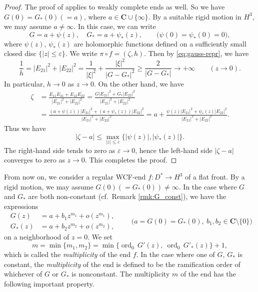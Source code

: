 \documentclass[a4paper]{amsart}
\theoremstyle{plain}
\theoremstyle{remark}
\numberwithin{equation}{section}
\begin{document}
\begin{proof}
 The proof of \cite[Lemma 3.10]{KUY2}
 applies to weakly complete ends as well.
 So we have
 $G(0)=G_*(0)(=a)$, where $a \in {\boldsymbol{C}}\cup\{\infty\}$.
 By a suitable rigid motion in $H^3$, we may assume $a \neq\infty$.
 In this case, we can write
 \[
     G = a + \psi(z),\quad
     G_* = a+\psi_*(z),
    \qquad \bigl(\psi(0)=\psi_*(0)=0\bigr),
 \]
 where $\psi(z)$, $\psi_*(z)$ are holomorphic
 functions defined on a sufficiently small closed disc 
 $\{|z|\le \varepsilon\}$.
 We write $\pi\circ f = (\zeta,h)$.
 Then 
 by \eqref{eq:gauss-repr}, we have
\[
   \frac{1}{h}=|E_{21}|^2+|E_{22}|^2=
   \frac{1}{|\xi|^2}+\frac{|\xi|^2}{|G-G_*|^2}
   \ge \frac{2}{|G-G_*|}\longrightarrow +\infty
   \qquad (z\to 0).
\]
 In particular, $h\to 0$ as $z\to 0$.
 On the other hand, we have
 \begin{align*}
    \zeta
      &= \frac{E_{11}\overline E_{21}+E_{12}\overline{E_{22}}}
      {|E_{21}|^2+|E_{22}|^2}
       = 
    \frac{G|E_{21}|^2+G_*|E_{22}|^2}
      {|E_{21}|^2+|E_{22}|^2}\\
     &=\frac{(a+\psi(z))|E_{21}|^2+
            (a+\psi_*(z))|E_{22}|^2}
             {|E_{21}|^2+|E_{22}|^2}
     =a + 
         \frac{\psi(z)|E_{21}|^2+
         \psi_*(z)|{E_{22}}|^2}
             {|E_{21}|^2+|E_{22}|^2}.
 \end{align*}
 Thus we have
 \[
      |\zeta -a|\le  \max_{|z|\le \varepsilon}
      \{|\psi(z)|,|\psi_*(z)|\}.
 \]
 The right-hand side tends to zero as $\varepsilon \to 0$, hence 
 the left-hand side $|\zeta -a|$ converges to zero as $z\to 0$.
  This completes the proof.
\end{proof}

From now on, we consider a regular WCF-end $f\colon{}D^*\to H^3$ of a
flat front.
By a rigid motion, we may assume $G(0)(=G_*(0)) \ne \infty$.
In the case where $G$ and $G_*$ are both non-constant
(cf.\ Remark \ref{rmk:G_const}),
we have the expressions
\begin{equation}\label{eq:gauss-normal0}
\begin{aligned}
   G(z)&=a+b_1 z^{m_1}+o(z^{m_1}), \\
 G_*(z)&=a+b_2 z^{m_2}+o(z^{m_2}),
\end{aligned}
   \qquad \bigl(a=G(0)=G_*(0),~ b_1,b_2\in {\boldsymbol{C}}\setminus\{0\}\bigr)
\end{equation}
on a neighborhood of $z=0$. 
We set
\begin{equation}\label{eq:multiplicity}
   m=\min\{m_1,m_2\}=\min\{{\operatorname{ord}}_0\,G'(z),~{\operatorname{ord}}_0\,G'_*(z)\}+1,
\end{equation}
which is called the {\it multiplicity\/} of the end
$f$.
In the case where one of $G$, $G_*$ is constant, 
the {\it multiplicity\/} of the end is defined to be the 
ramification order of whichever of $G$ or $G_*$ is nonconstant.
The multiplicity $m$ of the end has the following important property.
\end{document}

